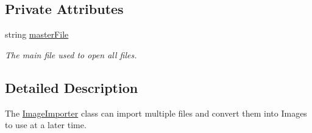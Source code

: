 \subsection*{Private Attributes}
\begin{DoxyCompactItemize}
\item 
string \hyperlink{classImageImporter_ac525acb521f6790cd85877f828fac54c}{master\-File}
\begin{DoxyCompactList}\small\item\em The main file used to open all files. \end{DoxyCompactList}\end{DoxyCompactItemize}


\subsection{Detailed Description}
The \hyperlink{classImageImporter}{Image\-Importer} class can import multiple files and convert them into Images to use at a later time. 

